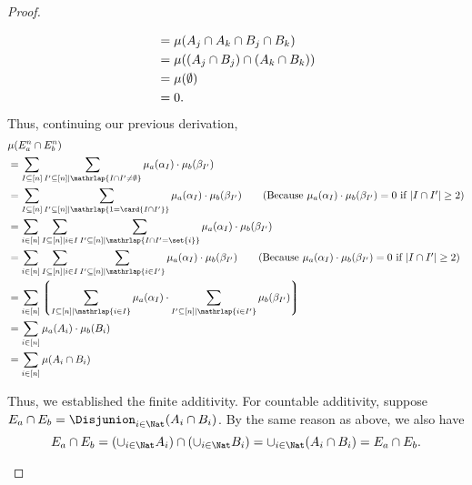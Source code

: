 \begin{proof}
\begin{itemize}
\begin{align}
    &= \mu(A_j \cap A_k \cap B_j \cap B_k) \notag \\
    &= \mu((A_j\cap B_j) \cap (A_k \cap B_k)) \notag \\
    &= \mu(\emptyset) \notag \\
    &= 0. \notag
  \end{align}
Thus, continuing our previous derivation,
\begin{align}
   &\mu(E^n_a \cap E^n_b) \notag \\
   &= \sum_{I \subseteq [n]} \sum_{I' \subseteq [n] \mid \mathrlap{I \cap I' \neq \emptyset}}  \mu_a(\alpha_I) \cdot \mu_b (\beta_{I'}) \notag \\
   &= \sum_{I \subseteq [n]}
        \sum_{I' \subseteq [n] \mid \mathrlap{1 = \card{I \cap I'}}}
          \mu_a(\alpha_I) \cdot \mu_b (\beta_{I'})
   \tag{Because $\mu_{a}(\alpha_I) \cdot \mu_{b}(\beta_{I'})=0$ if $|I \cap I'| \geq 2$}\\
   &= \sum_{i \in [n]}
        \sum_{I \subseteq [n] \mid i \in I}
          \sum_{I' \subseteq [n] \mid \mathrlap{I \cap I' = \set{i}} }
            \mu_a(\alpha_I) \cdot \mu_b (\beta_{I'})
      \notag \\
   &= \sum_{i \in [n]} \sum_{I \subseteq [n] \mid i \in I} \sum_{I' \subseteq [n] \mid \mathrlap{i \in I'}}  \mu_a(\alpha_I) \cdot \mu_b (\beta_{I'})
   \tag{Because $\mu_{a}(\alpha_I) \cdot \mu_{b}(\beta_{I'})=0$ if $|I \cap I'| \geq 2$}\\
   &= \sum_{i \in [n]}
         \left\lgroup
         \sum_{I \subseteq [n] \mid \mathrlap{i \in I}} \mu_a(\alpha_I)
         \cdot
         \sum_{I' \subseteq [n] \mid \mathrlap{i \in I'}} \mu_b (\beta_{I'})
         \right\rgroup
     \notag \\
   &= \sum_{i \in [n]} \mu_a(A_i) \cdot \mu_b(B_i) \notag \\
   &= \sum_{i \in [n]} \mu(A_i \cap B_i) \notag
  \end{align}

  Thus, we established the finite additivity.
  For countable additivity, suppose $E_a \cap E_b = \Disjunion_{i \in \Nat}(A_i \cap B_i)$. By the same reason as above, we also have
  \[
    E_a \cap E_b = (\cup_{i \in \Nat} A_i) \cap (\cup_{i \in \Nat} B_i) = \cup_{i \in \Nat} (A_i \cap B_i) = E_a \cap E_b.
  \]



\end{itemize}
\end{proof}
